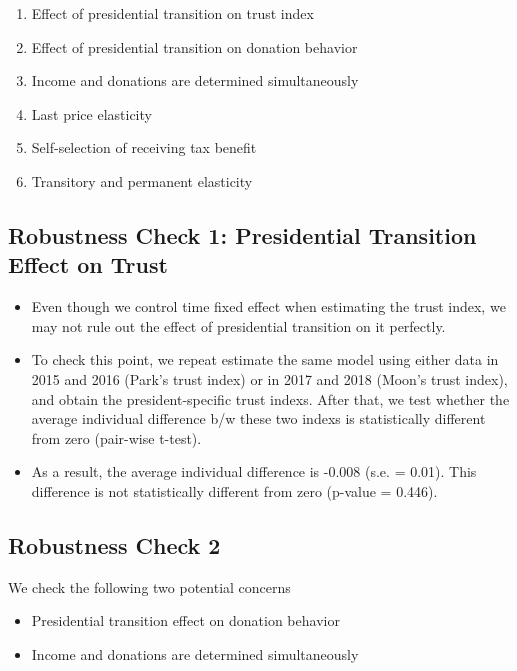 \documentclass[ review  , 3p ]{elsarticle}
\providecommand{\tightlist}{%
  \setlength{\itemsep}{0pt}\setlength{\parskip}{0pt}}
\begin{document}
  \begin{enumerate}
  \def\labelenumi{\arabic{enumi}.}
  \tightlist
  \item
    Effect of presidential transition on trust index
  \item
    Effect of presidential transition on donation behavior
  \item
    Income and donations are determined simultaneously
  \item
    Last price elasticity
  \item
    Self-selection of receiving tax benefit
  \item
    Transitory and permanent elasticity
  \end{enumerate}

  \hypertarget{robustness-check-1-presidential-transition-effect-on-trust}{%
  \subsection{Robustness Check 1: Presidential Transition Effect on Trust}\label{robustness-check-1-presidential-transition-effect-on-trust}}

  \begin{itemize}
  \tightlist
  \item
    Even though we control time fixed effect when estimating the trust index, we may not rule out the effect of presidential transition on it perfectly.
  \item
    To check this point, we repeat estimate the same model using either data in 2015 and 2016 (Park's trust index) or in 2017 and 2018 (Moon's trust index), and obtain the president-specific trust indexs. After that, we test whether the average individual difference b/w these two indexs is statistically different from zero (pair-wise t-test).
  \item
    As a result, the average individual difference is -0.008 (s.e. = 0.01). This difference is not statistically different from zero (p-value = 0.446).
  \end{itemize}

  \hypertarget{robustness-check-2}{%
  \subsection{Robustness Check 2}\label{robustness-check-2}}

  We check the following two potential concerns

  \begin{itemize}
  \tightlist
  \item
    Presidential transition effect on donation behavior
  \item
    Income and donations are determined simultaneously
  \end{itemize}
\end{document}
